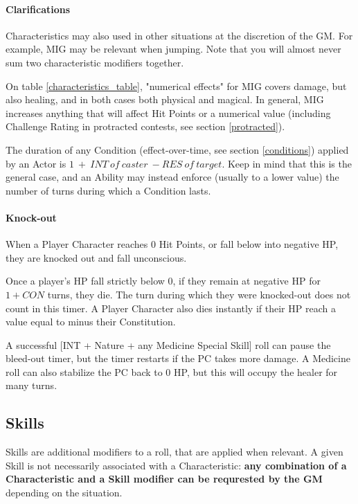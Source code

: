 \paragraph{Clarifications}

Characteristics may also used in other situations at the discretion of the GM. For example, MIG may be relevant when jumping. Note that you will almost never sum two characteristic modifiers together.

On table \ref{characteristics_table}, "numerical effects" for MIG covers damage, but also healing, and in both cases both physical and magical. In general, MIG increases anything that will affect Hit Points or a numerical value (including Challenge Rating in protracted contests, see section \ref{protracted}).

The duration of any Condition (effect-over-time, see section \ref{conditions}) applied by an Actor is $1 \ + \ INT \ of \ caster \ - RES \ of \ target$. Keep in mind that this is the general case, and an Ability may instead enforce (usually to a lower value) the number of turns during which a Condition lasts.


\paragraph{Knock-out} 

\label{knockout}

When a Player Character reaches 0 Hit Points, or fall below into negative HP, they are knocked out and fall unconscious. 

Once a player's HP fall strictly below 0, if they remain at negative HP for $1+CON$ turns, they die. The turn during which they were knocked-out does not count in this timer. A Player Character also dies instantly if their HP reach a value equal to minus their Constitution.

A successful [INT + Nature + any Medicine Special Skill] roll can pause the bleed-out timer, but the timer restarts if the PC takes more damage. A Medicine roll can also stabilize the PC back to 0 HP, but this will occupy the healer for many turns.


\subsection{Skills}
\label{skills}

Skills are additional modifiers to a roll, that are applied when relevant. A given Skill is not necessarily associated with a Characteristic: \textbf{any combination of a Characteristic and a Skill modifier can be requrested by the GM} depending on the situation.

